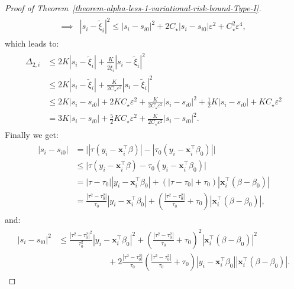 \documentclass[12pt]{article}
\numberwithin{equation}{section}
\begin{document}
\begin{proof}[Proof of Theorem~\ref{theorem-alpha-less-1-variational-risk-bound-Type-I}]
\begin{align}
\begin{split}
        \implies & |s_i - \tilde{\xi}_i|^2 \leq |s_i - s_{i0}|^2 + 2C_{\star}|s_i - s_{i0}| \varepsilon^2 + C_{\star}^2\varepsilon^4,
    \end{split}
\end{align}
%
which leads to:
%
\begin{align}\label{eq:proof-theorem1-21d}
    \begin{split}
        \Delta_{2,i} & \leq 2K|s_i - \tilde{\xi}_i| + \frac{K}{2\tilde{\xi}_i}|s_i - \tilde{\xi}_i|^2 \\
        & \leq 2K|s_i - \tilde{\xi}_i| + \frac{K}{2C_{\star}\varepsilon^2} |s_i - \tilde{\xi}_i|^2 \\
        & \leq 2K |s_i - s_{i0}| + 2KC_{\star}\varepsilon^2 + \frac{K}{2C_{\star}\varepsilon^2}|s_i - s_{i0}|^2 + \frac{1}{2}K |s_i - s_{i0}|  + KC_{\star}\varepsilon^2 \\
        & = 3K |s_i - s_{i0}| + \frac{5}{2}KC_{\star}\varepsilon^2 + \frac{K}{2C_{\star}\varepsilon^2} |s_i - s_{i0}|^2.
    \end{split}
\end{align}
%
Finally we get:
%
\begin{align}
    \begin{split} \label{eq:proof-theorem1-21e}
        |s_i - s_{i0}| &= \Big||\tau(y_i - \mathbf{x}_i^{\top}\beta)| - |\tau_0(y_i-\mathbf{x}_i^{\top}\beta_0)|\Big| \\
        &\leq \Big|\tau(y_i - \mathbf{x}_i^{\top}\beta) - \tau_0(y_i-\mathbf{x}_i^{\top}\beta_0)\Big| \\
        &= |\tau-\tau_0||y_i-\mathbf{x}_i^{\top}\beta_0| + \left(|\tau-\tau_0| + \tau_0\right)|\mathbf{x}_i^{\top}(\beta-\beta_0)| \\
        &= \frac{|\tau^2-\tau_0^2|}{\tau_0}|y_i-\mathbf{x}_i^{\top}\beta_0| + \left(\frac{|\tau^2-\tau_0^2|}{\tau_0} + \tau_0\right)|\mathbf{x}_i^{\top}(\beta-\beta_0)|,
    \end{split}
\end{align}
%
and:
%
%
\begin{align}
    \begin{split} \label{eq:proof-theorem1-21f}
        |s_i - s_{i0}|^2 &\leq \frac{|\tau^2-\tau_0^2|^2}{\tau_0^2}|y_i-\mathbf{x}_i^{\top}\beta_0|^2 + \left(\frac{|\tau^2-\tau_0^2|}{\tau_0} + \tau_0\right)^2|\mathbf{x}_i^{\top}(\beta-\beta_0)|^2\\
        & \qquad\qquad \qquad +
        2\frac{|\tau^2-\tau_0^2|}{\tau_0}\left(\frac{|\tau^2-\tau_0^2|}{\tau_0} + \tau_0\right)|y_i-\mathbf{x}_i^{\top}\beta_0||\mathbf{x}_i^{\top}(\beta-\beta_0)|.

\end{split}
\end{align}
\end{proof}
\end{document}
